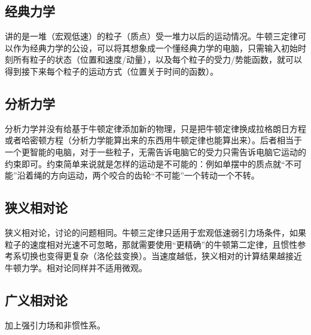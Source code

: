 
\subsection{经典力学}
讲的是一堆（宏观低速）的粒子（质点）受一堆力以后的运动情况。牛顿三定律可以作为经典力学的公设，可以将其想象成一个懂经典力学的电脑，只需输入初始时刻所有粒子的状态（位置和速度/动量），以及每个粒子的受力/势能函数，就可以得到接下来每个粒子的运动方式（位置关于时间的函数）。

\subsection{分析力学}
分析力学并没有给基于牛顿定律添加新的物理，只是把牛顿定律换成拉格朗日方程或者哈密顿方程（分析力学能算出来的东西用牛顿定律也能算出来）。后者相当于一个更智能的电脑，对于一些粒子，无需告诉电脑它的受力只需告诉电脑它运动的约束即可。约束简单来说就是怎样的运动是不可能的：例如单摆中的质点就“不可能”沿着绳的方向运动，两个咬合的齿轮“不可能”一个转动一个不转。

\subsection{狭义相对论}
狭义相对论，讨论的问题相同。牛顿三定律只适用于宏观低速弱引力场条件，如果粒子的速度相对光速不可忽略，那就需要使用“更精确”的牛顿第二定律，且惯性参考系切换也变得更复杂（洛伦兹变换）。当速度越低，狭义相对的计算结果越接近牛顿力学。相对论同样并不适用微观。

\subsection{广义相对论}
加上强引力场和非惯性系。
